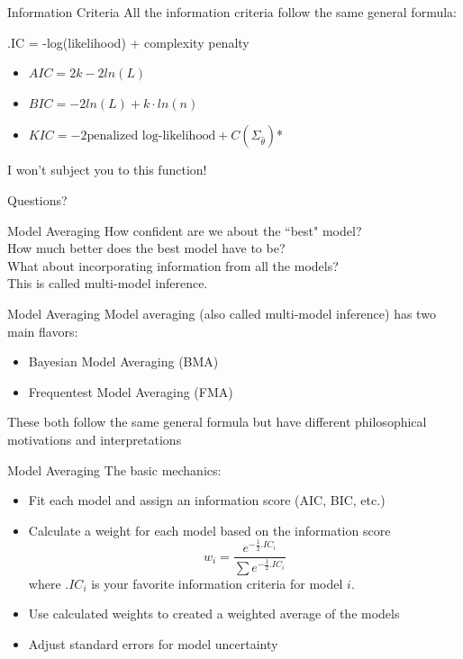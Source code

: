 \documentclass{beamer}\usepackage[]{graphicx}\usepackage[]{color}
\begin{document}
\begin{frame}{Information Criteria}
All the information criteria follow the same general formula:\\
\bigskip
\begin{center}
.IC = -log(likelihood) + complexity penalty\\
\end{center}
\bigskip
\begin{itemize}
\item $AIC= 2k - 2ln(L)$
\item $BIC= -2ln(L) + k \cdot ln(n)$
\item $KIC = -2 \text{penalized log-likelihood} + C\left(\hat{\Sigma}_{\hat{\theta}}\right)$*
\end{itemize}
{\tiny *I won't subject you to this function!}
\end{frame}

\begin{frame}
Questions?
\end{frame}

\begin{frame}{Model Averaging}
How confident are we about the ``best" model?\\
\pause
\bigskip
How much better does the best model have to be?\\
\pause
\bigskip
What about incorporating information from all the models?\\
\pause
\bigskip
This is called multi-model inference.
\end{frame}

\begin{frame}{Model Averaging}
Model averaging (also called multi-model inference) has two main flavors:
\bigskip
\pause
\begin{itemize}
\item Bayesian Model Averaging (BMA)
\item Frequentest Model Averaging (FMA)
\end{itemize}
\pause
\bigskip
These both follow the same general formula but have different philosophical motivations and interpretations
\end{frame}

\begin{frame}{Model Averaging}
The basic mechanics:
\begin{itemize}
\item Fit each model and assign an information score (AIC, BIC, etc.)
\pause
\item Calculate a weight for each model based on the information score
$$w_i = \frac{e^{-\frac{1}{2}.IC_i}}{\sum e^{-\frac{1}{2}.IC_i}}$$
where $.IC_i$ is your favorite information criteria for model $i$.
\pause
\item Use calculated weights to created a weighted average of the models
\pause
\item Adjust standard errors for model uncertainty
\end{itemize}
\end{frame}
\end{document}
